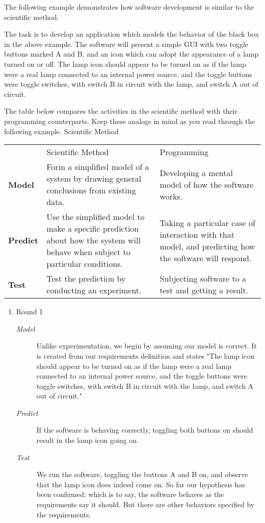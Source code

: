 \documentclass{article}
\begin{document}
\begin{enumerate}
The following example demonstrates how software development is similar
to the scientific method.

The task is to develop an application which models the behavior of the
black box in the above example. The software will present a simple GUI
with two toggle buttons marked A and B, and an icon which can adopt the
appearance of a lamp turned on or off. The lamp icon should appear to be
turned on as if the lamp were a real lamp connected to an internal power
source, and the toggle buttons were toggle switches, with switch B in
circuit with the lamp, and switch A out of circuit.

The table below compares the activities in the scientific method with
their programming counterparts. Keep these analogs in mind as you read
through the following example. Scientific Method

\begin{center}
\begin{tabular}{lll}
 & Scientific Method & Programming\\
\textbf{Model} & Form a simplified model of a system by drawing general conclusions from existing data. & Developing a mental model of how the software works.\\
\textbf{Predict} & Use the simplified model to make a specific prediction about how the system will behave when subject to particular conditions. & Taking a particular case of interaction with that model, and predicting how the software will respond.\\
\textbf{Test} & Test the prediction by conducting an experiment. & Subjecting software to a test and getting a result.\\
\end{tabular}
\end{center}

\begin{enumerate}
\item Round 1
\label{sec:orgheadline393}

\begin{description}
\item[{\emph{Model}}] Unlike experimentation, we begin by assuming our model is
correct. It is created from our requirements definition and states
"The lamp icon should appear to be turned on as if the lamp were a
real lamp connected to an internal power source, and the toggle
buttons were toggle switches, with switch B in circuit with the lamp,
and switch A out of circuit."
\item[{\emph{Predict}}] If the software is behaving correctly, toggling both
buttons on should result in the lamp icon going on.
\item[{\emph{Test}}] We run the software, toggling the buttons A and B on, and
observe that the lamp icon does indeed come on. So far our hypothesis
has been confirmed; which is to say, the software behaves as the
requirements say it should. But there are other behaviors specified
by the requirements.
\end{description}


\end{enumerate}
\end{enumerate}
\end{document}

